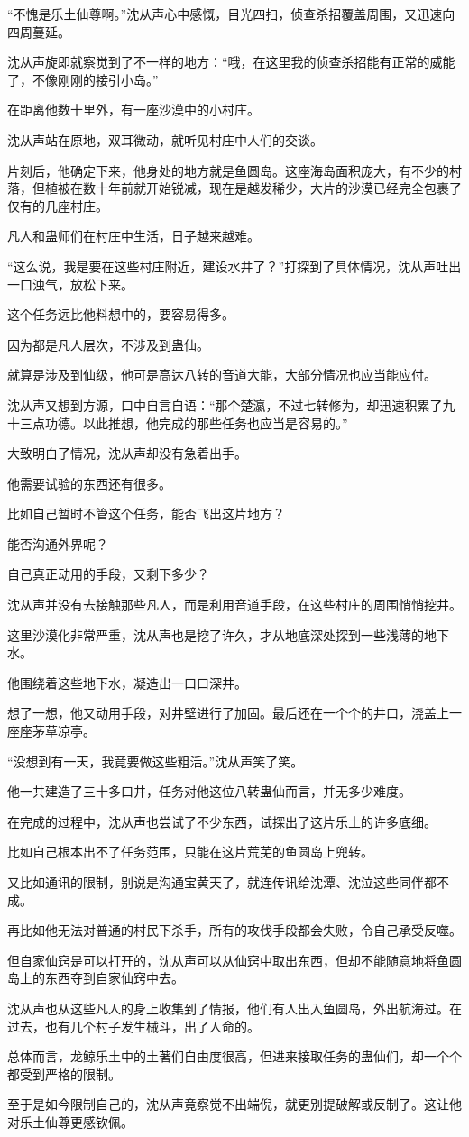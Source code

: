 \begin{this_body}
“不愧是乐土仙尊啊。”沈从声心中感慨，目光四扫，侦查杀招覆盖周围，又迅速向四周蔓延。

沈从声旋即就察觉到了不一样的地方：“哦，在这里我的侦查杀招能有正常的威能了，不像刚刚的接引小岛。”

在距离他数十里外，有一座沙漠中的小村庄。

沈从声站在原地，双耳微动，就听见村庄中人们的交谈。

片刻后，他确定下来，他身处的地方就是鱼圆岛。这座海岛面积庞大，有不少的村落，但植被在数十年前就开始锐减，现在是越发稀少，大片的沙漠已经完全包裹了仅有的几座村庄。

凡人和蛊师们在村庄中生活，日子越来越难。

“这么说，我是要在这些村庄附近，建设水井了？”打探到了具体情况，沈从声吐出一口浊气，放松下来。

这个任务远比他料想中的，要容易得多。

因为都是凡人层次，不涉及到蛊仙。

就算是涉及到仙级，他可是高达八转的音道大能，大部分情况也应当能应付。

沈从声又想到方源，口中自言自语：“那个楚瀛，不过七转修为，却迅速积累了九十三点功德。以此推想，他完成的那些任务也应当是容易的。”

大致明白了情况，沈从声却没有急着出手。

他需要试验的东西还有很多。

比如自己暂时不管这个任务，能否飞出这片地方？

能否沟通外界呢？

自己真正动用的手段，又剩下多少？

沈从声并没有去接触那些凡人，而是利用音道手段，在这些村庄的周围悄悄挖井。

这里沙漠化非常严重，沈从声也是挖了许久，才从地底深处探到一些浅薄的地下水。

他围绕着这些地下水，凝造出一口口深井。

想了一想，他又动用手段，对井壁进行了加固。最后还在一个个的井口，浇盖上一座座茅草凉亭。

“没想到有一天，我竟要做这些粗活。”沈从声笑了笑。

他一共建造了三十多口井，任务对他这位八转蛊仙而言，并无多少难度。

在完成的过程中，沈从声也尝试了不少东西，试探出了这片乐土的许多底细。

比如自己根本出不了任务范围，只能在这片荒芜的鱼圆岛上兜转。

又比如通讯的限制，别说是沟通宝黄天了，就连传讯给沈潭、沈泣这些同伴都不成。

再比如他无法对普通的村民下杀手，所有的攻伐手段都会失败，令自己承受反噬。

但自家仙窍是可以打开的，沈从声可以从仙窍中取出东西，但却不能随意地将鱼圆岛上的东西夺到自家仙窍中去。

沈从声也从这些凡人的身上收集到了情报，他们有人出入鱼圆岛，外出航海过。在过去，也有几个村子发生械斗，出了人命的。

总体而言，龙鲸乐土中的土著们自由度很高，但进来接取任务的蛊仙们，却一个个都受到严格的限制。

至于是如今限制自己的，沈从声竟察觉不出端倪，就更别提破解或反制了。这让他对乐土仙尊更感钦佩。

\end{this_body}

